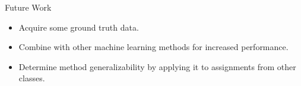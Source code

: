 \documentclass[10pt]{beamer}
\begin{document}
\begin{frame}[fragile]{Future Work}
    \begin{itemize}
        \item Acquire some ground truth data.
        \item Combine with other machine learning methods for increased
            performance.
        \item Determine method generalizability by applying it to assignments
            from other classes.
    \end{itemize}
\end{frame}
\end{document}

